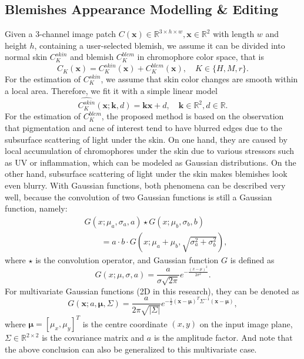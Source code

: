 \begin{spacing}{1.5}
\section{Blemishes Appearance Modelling \& Editing}
Given a 3-channel image patch $C(\mathbf{x})\in\mathbb{R}^{3\times h\times w}, \mathbf{x}\in\mathbb{R}^2$ with length $w$ and height $h$, containing a user-selected blemish, we assume it can be divided into normal skin $C_K^{skin}$ and blemish $C_K^{blem}$ in chromophore color space, that is
\begin{equation}
  C_K(\mathbf{x}) = C_K^{skin}(\mathbf{x}) + C_K^{blem}(\mathbf{x}),\quad K\in\{H,M,r\}.
\end{equation}
For the estimation of $C_K^{skin}$, we assume that skin color changes are smooth within a local area. Therefore, we fit it with a simple linear model
\begin{equation}
  \hat{C_K^{skin}}(\mathbf{x};\mathbf{k},d)=\mathbf{k}\mathbf{x}+d,\quad\mathbf{k}\in\mathbb{R}^2, d\in\mathbb{R}.
\end{equation}
For the estimation of $C_K^{blem}$, the proposed method is based on the observation that pigmentation and acne of interest tend to have blurred edges due to the subsurface scattering of light under the skin. On one hand, they are caused by local accumulation of chromophores under the skin due to various stressors such as UV or inflammation, which can be modeled as Gaussian distributions. On the other hand, subsurface scattering of light under the skin makes blemishes look even blurry. With Gaussian functions, both phenomena can be described very well, because the convolution of two Gaussian functions is still a Gaussian function, namely:
\begin{equation}
    \begin{aligned}
         & G(x; \mu_a, \sigma_a, a)\star G(x; \mu_b, \sigma_b, b)                 \\
         & \qquad= a\cdot b\cdot G(x; \mu_a+\mu_b, \sqrt{\sigma_a^2+\sigma_b^2}),
    \end{aligned}
\end{equation}
where $\star$ is the convolution operator, and Gaussian function $G$ is defined as
\begin{equation}
    G(x; \mu, \sigma, a) = \frac{a}{\sigma\sqrt{2\pi}}e^{-\frac{{(x - \mu)^2}}{{2\sigma^2}}}.
\end{equation}
For multivariate Gaussian functions (2D in this research), they can be denoted as
\begin{equation}
    G(\mathbf{x}; a, \mathbf{\mu}, \Sigma)=\frac{a}{2\pi\sqrt{|\Sigma|}}e^{-\frac{1}{2}(\mathbf{x}-\mathbf{\mu})^T\Sigma^{-1}(\mathbf{x}-\mathbf{\mu})},
  \end{equation}
where $\mathbf{\mu}=[\mu_x,\mu_y]^T$ is the centre coordinate $(x,y)$ on the input image plane, $\Sigma\in\mathbb{R}^{2\times2}$ is the covariance matrix and $a$ is the amplitude factor. And note that the above conclusion can also be generalized to this multivariate case.


\end{spacing}
